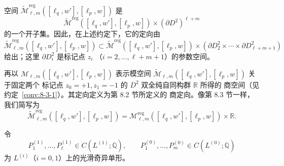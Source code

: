 空间
$\widetilde{\mathcal M}^{\mathrm{reg}}_{\ell,m}
([\ell_q,w'],[\ell_p,w])$
是
\[
 \widetilde{\mathcal M}^{\mathrm{reg}}
 ([\ell_q,w'],[\ell_p,w])\times(\partial D^2)^{\ell+m}
\]
的一个开子集。因此，在上述约定下，它的定向由
\[
 \widetilde{\mathcal M}^{\mathrm{reg}}_{\ell,m}
 ([\ell_q,w'],[\ell_p,w])
 \subset
 \widetilde{\mathcal M}^{\mathrm{reg}}
 ([\ell_q,w'],[\ell_p,w])
 \times
 (\partial D_2^2\times\cdots\times\partial D_{\ell+m+1}^2)
\]
给出；这里 $\partial D_i^2$ 是标记点 $z_i$
（$i=2,\ldots,\ell+m+1$）的参数空间。

再以 $\mathcal M_{\ell,m}([\ell_q,w'],[\ell_p,w])$ 表示模空间
$\widetilde{\mathcal M}_{\ell,m}([\ell_q,w'],[\ell_p,w])$ 关于固定两个
标记点 $z_0=+1,z_1=-1$ 的 $D^2$ 双全纯自同构群 $\mathbb R$ 所得的
商空间（见约定~\ref{conv:8-3-1}）。其定向定义为第 8.2 节所定义的
商定向。像第 8.3 节一样，我们简写为
\[
 \widetilde{\mathcal M}^{\mathrm{reg}}_{\ell,m}
 ([\ell_q,w'],[\ell_p,w])
 =\mathcal M^{\mathrm{reg}}_{\ell,m}
 ([\ell_q,w'],[\ell_p,w])\times\mathbb R.
\]

令
\[
 P_1^{(1)},\ldots,P_\ell^{(1)}\in C(L^{(1)};\mathbb Q),
 \qquad
 P_1^{(0)},\ldots,P_m^{(0)}\in C(L^{(0)};\mathbb Q)
\]
为 $L^{(i)}$（$i=0,1$）上的光滑奇异单形。

